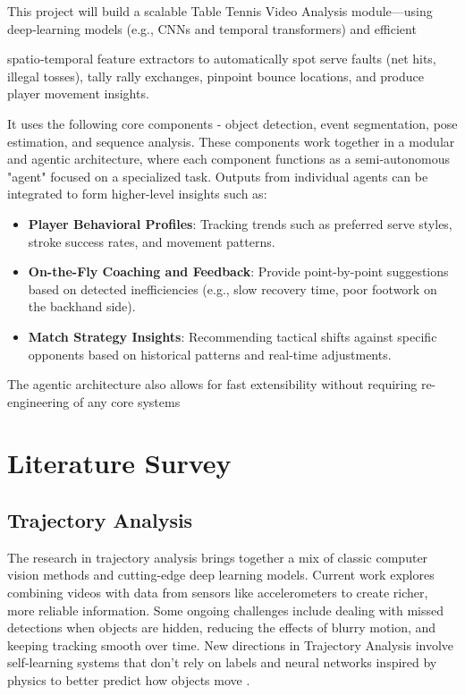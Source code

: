 \documentclass[conference]{IEEEtran}
\begin{document}
This project will build a scalable Table Tennis Video Analysis module—using deep‑learning models (e.g., CNNs and temporal transformers) and efficient 

spatio‑temporal feature extractors to automatically spot serve faults (net hits, illegal tosses), tally rally exchanges, pinpoint bounce locations, and produce player movement insights.

It uses the following core components - object detection, event segmentation, pose estimation, and sequence analysis. These components work together in a modular and agentic architecture, where each component functions as a semi-autonomous "agent" focused on a specialized task. Outputs from individual agents can be integrated to form higher-level insights such as:

\begin{itemize}
    \item \textbf{Player Behavioral Profiles}: Tracking trends such as preferred serve styles, stroke success rates, and movement patterns.

    \item \textbf{On-the-Fly Coaching and Feedback}: Provide point-by-point suggestions based on detected inefficiencies (e.g., slow recovery time, poor footwork on the backhand side).

    \item \textbf{Match Strategy Insights}: Recommending tactical shifts against specific opponents based on historical patterns and real-time adjustments.
\end{itemize}
The agentic architecture also allows for fast extensibility without requiring re-engineering of any core systems


\section{Literature Survey}

\subsection{Trajectory Analysis}

The research in trajectory analysis brings together a mix of classic computer vision methods and cutting-edge deep learning models. Current work explores combining videos with data from sensors like accelerometers  to create richer, more reliable information. Some ongoing challenges include dealing with missed detections when objects are hidden, reducing the effects of blurry motion, and keeping tracking smooth over time. New directions in Trajectory Analysis involve self-learning systems that don't rely on labels and neural networks inspired by physics to better predict how objects move \cite{pongball}.
\end{document}
